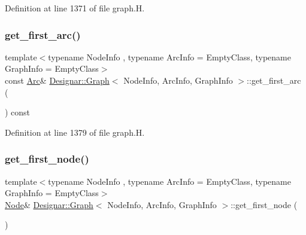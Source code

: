 Definition at line 1371 of file graph.\+H.

\mbox{\label{class_designar_1_1_graph_a3a4be7fef798a957b0a66102f1d30c39}} 
\subsubsection{\texorpdfstring{get\+\_\+first\+\_\+arc()}{get\_first\_arc()}\hspace{0.1cm}{\footnotesize\ttfamily [2/2]}}
{\footnotesize\ttfamily template$<$typename Node\+Info , typename Arc\+Info  = Empty\+Class, typename Graph\+Info  = Empty\+Class$>$ \\
const \hyperlink{class_designar_1_1_graph_a74c730ef4ce2d20f998d72bd25c2b5bf}{Arc}\& \hyperlink{class_designar_1_1_graph}{Designar\+::\+Graph}$<$ Node\+Info, Arc\+Info, Graph\+Info $>$\+::get\+\_\+first\+\_\+arc (\begin{DoxyParamCaption}{ }\end{DoxyParamCaption}) const\hspace{0.3cm}{\ttfamily [inline]}}



Definition at line 1379 of file graph.\+H.

\mbox{\label{class_designar_1_1_graph_ab9f34a6b6160f9e66a3103c78b13d7d6}} 
\subsubsection{\texorpdfstring{get\+\_\+first\+\_\+node()}{get\_first\_node()}\hspace{0.1cm}{\footnotesize\ttfamily [1/2]}}
{\footnotesize\ttfamily template$<$typename Node\+Info , typename Arc\+Info  = Empty\+Class, typename Graph\+Info  = Empty\+Class$>$ \\
\hyperlink{class_designar_1_1_graph_a5dfc7dba9d092ac489c72e40390c37d0}{Node}\& \hyperlink{class_designar_1_1_graph}{Designar\+::\+Graph}$<$ Node\+Info, Arc\+Info, Graph\+Info $>$\+::get\+\_\+first\+\_\+node (\begin{DoxyParamCaption}{ }\end{DoxyParamCaption})\hspace{0.3cm}{\ttfamily [inline]}}



